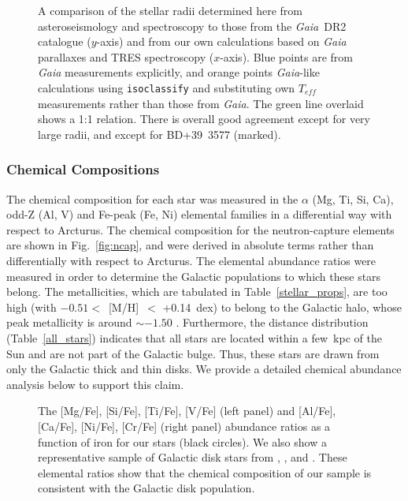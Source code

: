 \documentclass[modern]{aastex62}
\newcommand{\gaia}{\textit{Gaia}\xspace}
\begin{document}
\begin{figure}

\caption{\label{gaia_comparison}
A comparison of the stellar radii determined here from asteroseismology and spectroscopy to those from the \gaia~DR2 catalogue ($y$-axis) and from our own calculations based on \gaia parallaxes and TRES spectroscopy ($x$-axis). Blue points are from \gaia measurements explicitly, and orange points \gaia-like calculations using \texttt{isoclassify} \citep{huber2017} and substituting own $T_{eff}$ measurements rather than those from \gaia. The green line overlaid shows a 1:1 relation. There is overall good agreement except for very large radii, and except for BD+39~3577 (marked).}
\end{figure}

\subsubsection{Chemical Compositions}
\label{chemical}
The chemical composition for each star was measured in the $\alpha$ (Mg, Ti, Si, Ca), odd-Z (Al, V) and Fe-peak (Fe, Ni) elemental families in a differential way with respect to Arcturus. The chemical composition for the neutron-capture elements are shown in Fig.~\ref{fig:ncap}, and were derived in absolute terms rather than differentially with respect to Arcturus. The elemental abundance ratios were measured in order to determine the Galactic populations to which these stars belong. The metallicities, which are tabulated in Table~\ref{stellar_props}, are too high (with $-0.51<$~[M/H]~$<$ +0.14~dex) to belong to the Galactic halo, whose peak metallicity is around $\sim -1.50$ \cite[e.g.][]{Chiba2000}. Furthermore, the distance distribution (Table~\ref{all_stars}) indicates that all stars are located within a few~kpc of the Sun and are not part of the Galactic bulge. Thus, these stars are drawn from only the Galactic thick and thin disks. We provide a detailed chemical abundance analysis below to support this claim.\\


\begin{figure*}

\caption{\label{alphael}
The [Mg/Fe], [Si/Fe], [Ti/Fe], [V/Fe] (left panel) and [Al/Fe], [Ca/Fe], [Ni/Fe], [Cr/Fe] (right panel) abundance ratios as a function of iron for our stars (black circles). We also show a representative sample of Galactic disk stars from \citet[open red squares]{Bensby2014}, \citet[open blue squares]{Adibekyan2012}, and \citet[teal circles]{Battistini2015}. These elemental ratios show that the chemical composition of our sample is consistent with the Galactic disk population. } %
\end{figure*}
\end{document}
